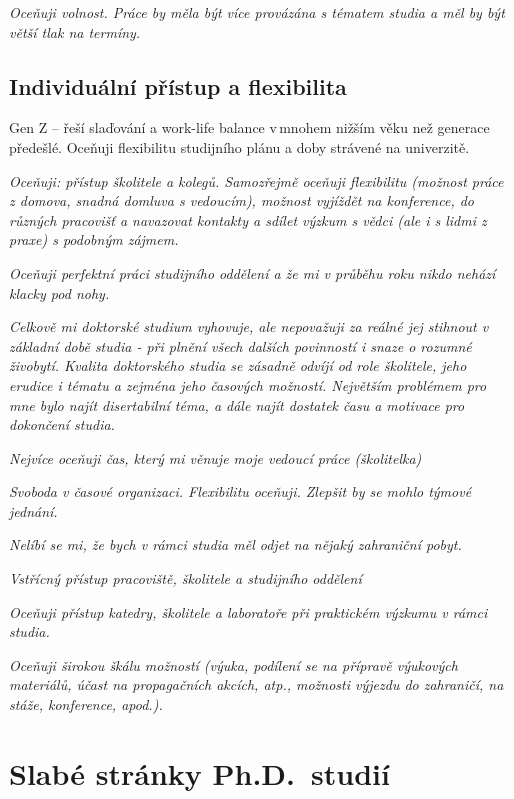 \documentclass[
  czech,
  14pt,
  a4paper,
  DIV=11,
  numbers=noendperiod]{scrreprt}
\begin{document}
\emph{Oceňuji volnost. Práce by měla být více provázána s tématem studia
a měl by být větší tlak na termíny.}

\subsection{Individuální přístup a
flexibilita}\label{individuuxe1lnuxed-pux159uxedstup-a-flexibilita}

Gen Z -- řeší slaďování a work-life balance v\,mnohem nižším věku než
generace předešlé. Oceňuji flexibilitu studijního plánu a doby strávené
na univerzitě.

\emph{Oceňuji: přístup školitele a kolegů. Samozřejmě oceňuji
flexibilitu (možnost práce z domova, snadná domluva s vedoucím), možnost
vyjíždět na konference, do různých pracovišť a navazovat kontakty a
sdílet výzkum s vědci (ale i s lidmi z praxe) s podobným zájmem.}

\emph{Oceňuji perfektní práci studijního oddělení a že mi v průběhu roku
nikdo nehází klacky pod nohy.}

\emph{Celkově mi doktorské studium vyhovuje, ale nepovažuji za reálné
jej stihnout v základní době studia - při plnění všech dalších
povinností i snaze o rozumné živobytí. Kvalita doktorského studia se
zásadně odvíjí od role školitele, jeho erudice i tématu a zejména jeho
časových možností. Největším problémem pro mne bylo najít disertabilní
téma, a dále najít dostatek času a motivace pro dokončení studia.}

\emph{Nejvíce oceňuji čas, který mi věnuje moje vedoucí práce
(školitelka)}

\emph{Svoboda v časové organizaci. Flexibilitu oceňuji. Zlepšit by se
mohlo týmové jednání.}

\emph{Nelíbí se mi, že bych v rámci studia měl odjet na nějaký
zahraniční pobyt.}

\emph{Vstřícný přístup pracoviště, školitele a studijního oddělení}

\emph{Oceňuji přístup katedry, školitele a laboratoře při praktickém
výzkumu v rámci studia.}

\emph{Oceňuji širokou škálu možností (výuka, podílení se na přípravě
výukových materiálů, účast na propagačních akcích, atp., možnosti
výjezdu do zahraničí, na stáže, konference, apod.).}

\section{Slabé stránky
Ph.D.~studií}\label{slabuxe9-struxe1nky-ph.d.-studiuxed}
\end{document}
